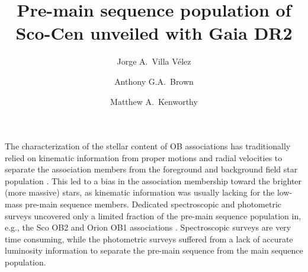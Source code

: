 \documentclass[RNAAS]{aastex62}
\begin{document}
\title{Pre-main sequence population of Sco-Cen unveiled with Gaia DR2}


\author[0000-0002-8300-3754]{Jorge A.~Villa V\'{e}lez}

\author[0000-0002-7419-9679]{Anthony G.A.~Brown}

\author[0000-0002-7064-8270]{Matthew A.~Kenworthy}


\section{} 

The characterization of the stellar content of OB associations has traditionally relied on kinematic information from proper motions and radial velocities to separate the association members from the foreground and background field star population \citep{deZeeuw99, Wright18}. This led to a bias in the association membership toward the brighter (more massive) stars, as kinematic information was usually lacking for the low-mass pre-main sequence members. Dedicated spectroscopic and photometric surveys uncovered only a limited fraction of the pre-main sequence population in, e.g., the Sco OB2 and Orion OB1 associations \citep[e.g.][]{Preibisch02, Preibisch08, Briceno18, Kounkel17}. Spectroscopic surveys are very time consuming, while the photometric surveys suffered from a lack of accurate luminosity information to separate the pre-main sequence from the main sequence population. 
\end{document}
